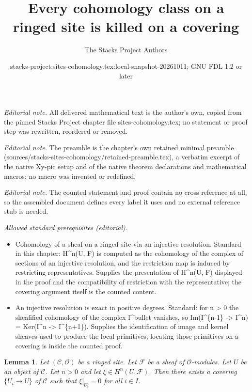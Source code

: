 \documentclass[10pt,a4paper]{amsart}
\title{Every cohomology class on a ringed site is killed on a covering}
\author{The Stacks Project Authors}
\date{stacks-project:sites-cohomology.tex:local-snapshot-20261011; GNU FDL 1.2 or later}
\theoremstyle{plain}
\newtheorem{lemma}[subsection]{Lemma}
\theoremstyle{definition}
\theoremstyle{remark}
\numberwithin{equation}{subsection}
\begin{document}
\maketitle
\noindent\textit{Editorial note.} All delivered mathematical text is the author's own, copied from the pinned Stacks Project chapter file sites-cohomology.tex; no statement or proof step was rewritten, reordered or removed.\par\medskip
\noindent\textit{Editorial note.} The preamble is the chapter's own retained minimal preamble (sources/stacks-sites-cohomology/retained-preamble.tex), a verbatim excerpt of the native Xy-pic setup and of the native theorem declarations and mathematical macros; no macro was invented or redefined.\par\medskip
\noindent\textit{Editorial note.} The counted statement and proof contain no cross reference at all, so the assembled document defines every label it uses and no external reference stub is needed.\par\medskip
\noindent\textit{Allowed standard prerequisites (editorial).}\begin{itemize}
\item Cohomology of a sheaf on a ringed site via an injective resolution. Standard in this chapter: H\textasciicircum{}n(U, F) is computed as the cohomology of the complex of sections of an injective resolution, and the restriction map is induced by restricting representatives. Supplies the presentation of H\textasciicircum{}n(U, F) displayed in the proof and the compatibility of restriction with the representative; the covering argument itself is the counted content.
\item An injective resolution is exact in positive degrees. Standard: for n > 0 the sheafified cohomology of the complex I\textasciicircum{}bullet vanishes, so Im(I\textasciicircum{}\{n-1\} -> I\textasciicircum{}n) = Ker(I\textasciicircum{}n -> I\textasciicircum{}\{n+1\}). Supplies the identification of image and kernel sheaves used to produce the local primitives; locating those primitives on a covering is inside the counted proof.
\end{itemize}\medskip
\begin{lemma}
\label{lemma-kill-cohomology-class-on-covering}
Let $(\mathcal{C}, \mathcal{O})$ be a ringed site.
Let $\mathcal{F}$ be a sheaf of $\mathcal{O}$-modules.
Let $U$ be an object of $\mathcal{C}$.
Let $n > 0$ and let $\xi \in H^n(U, \mathcal{F})$.
Then there exists a covering $\{U_i \to U\}$ of $\mathcal{C}$
such that $\xi|_{U_i} = 0$ for all $i \in I$.
\end{lemma}
\end{document}
